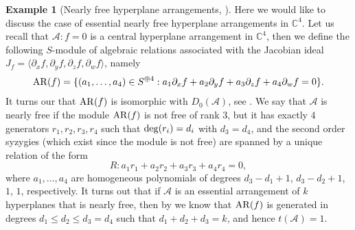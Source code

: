 \documentclass[11pt]{article}
\theoremstyle{plain}
\theoremstyle{definition}
\newtheorem{example}[thm]{Example}
\begin{document}
\begin{example}[{Nearly free hyperplane arrangements, \cite[Definition 5.3]{DS}}]
Here we would like to discuss the case of essential nearly free hyperplane arrangements in $\mathbb{C}^{4}$.
Let us recall that $\mathcal{A} : f= 0$ is a central hyperplane arrangement in $\mathbb{C}^{4}$, then we define the following $S$-module of algebraic relations associated with the Jacobian ideal $J_{f} = \langle \partial_{x}f, \partial_{y}f, \partial_{z}f , \partial_{w}f \rangle$, namely
$${\rm AR}(f) = \{ (a_{1}, \ldots ,a_4) \in S^{\oplus 4} : a_{1}\partial_{x}f + a_{2}\partial_{y}f + a_{3}\partial_{z}f +a_{4}\partial_{w}f=0\}.$$
It turns our that ${\rm AR}(f)$ is isomorphic with $D_{0}(\mathcal{A})$, see \cite[pp. 151 -- 152]{Dimca}.
We say that $\mathcal{A}$ is nearly free if the module ${\rm AR}(f)$ is not free of rank $3$, but it has exactly $4$ generators $r_{1},r_{2},r_{3},r_{4}$ such that ${\rm deg}(r_{i}) = d_{i}$ with $d_{3}=d_{4}$, and the second order syzygies (which exist since the module is not free) are spanned by a unique relation of the form
\[R : a_{1}r_{1} + a_{2}r_{2} + a_{3}r_{3} + a_{4}r_{4} = 0,\]
where $a_{1}, \ldots, a_{4}$ are homogeneous polynomials of degrees $d_{3}-d_{1}+1$, $d_{3}-d_{2}+1$, $1$, $1$, respectively. It turns out that if $\mathcal{A}$ is an essential arrangement of $k$ hyperplanes that is nearly free, then by \cite[Theorem 5.4 ii)]{DS} we know that ${\rm AR}(f)$ is generated in degrees $d_{1} \leq d_{2} \leq d_{3}=d_{4}$ such that $d_{1} + d_{2} + d_{3} = k$, and hence
$t(\mathcal{A})=1$.
\end{example}
\end{document}
